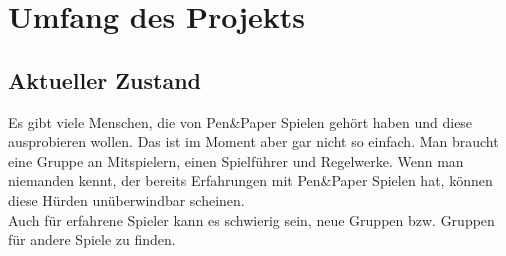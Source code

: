 \documentclass[DIV=13, 10pt,a4paper]{scrartcl} %
\begin{document}
\section{Umfang des Projekts}
	\subsection*{Aktueller Zustand}
	Es gibt viele Menschen, die von Pen\&Paper Spielen gehört haben und diese ausprobieren wollen. Das ist im Moment aber gar nicht so einfach. Man braucht eine Gruppe an Mitspielern, einen Spielführer und Regelwerke. Wenn man niemanden kennt, der bereits Erfahrungen mit Pen\&Paper Spielen hat, können diese Hürden unüberwindbar scheinen.\\
	Auch für erfahrene Spieler kann es schwierig sein, neue Gruppen bzw. Gruppen für andere Spiele zu finden. 	
\end{document}
